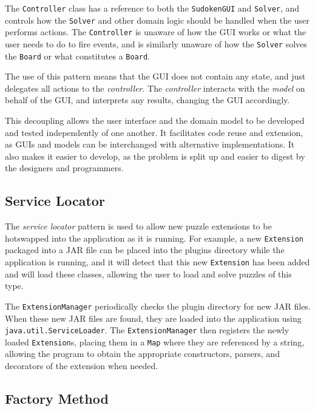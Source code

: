 \documentclass[a4paper, 11pt]{article}
\begin{document}
The \texttt{Controller} class has a reference to both the \texttt{SudokenGUI} and \texttt{Solver}, and controls how the \texttt{Solver} and other domain logic should be handled when the user performs actions. The \texttt{Controller} is unaware of how the GUI works or what the user needs to do to fire events, and is similarly unaware of how the \texttt{Solver} solves the \texttt{Board} or what constitutes a \texttt{Board}.

The use of this pattern means that the GUI does not contain any state, and just delegates all actions to the \textit{controller}. The \textit{controller} interacts with the \textit{model} on behalf of the GUI, and interprets any results, changing the GUI accordingly.

This decoupling allows the user interface and the domain model to be developed and tested independently of one another. It facilitates code reuse and extension, as GUIs and models can be interchanged with alternative implementations. It also makes it easier to develop, as the problem is split up and easier to digest by the designers and programmers.

\subsection{Service Locator}

The \textit{service locator} pattern is used to allow new puzzle extensions to be hotswapped into the application as it is running. For example, a new \texttt{Extension} packaged into a JAR file can be placed into the plugins directory while the application is running, and it will detect that this new \texttt{Extension} has been added and will load these classes, allowing the user to load and solve puzzles of this type.

The \texttt{ExtensionManager} periodically checks the plugin directory for new JAR files. When these new JAR files are found, they are loaded into the application using \texttt{java.util.ServiceLoader}. The \texttt{ExtensionManager} then registers the newly loaded \texttt{Extension}s, placing them in a \texttt{Map} where they are referenced by a string, allowing the program to obtain the appropriate constructors, parsers, and decorators of the extension when needed.

\subsection{Factory Method}
\end{document}
